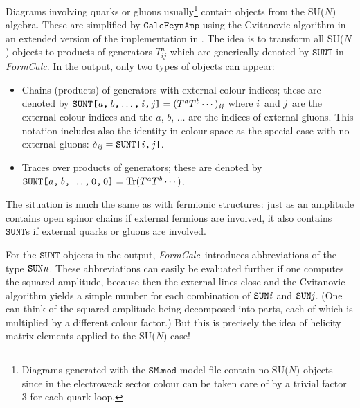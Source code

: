 \documentclass[twoside,11pt]{article}
\makeatletter
\def\indextt#1{\index{#1@\texttt{#1}}}
\def\FC{\textit{FormCalc}}
\def\Var#1{\ensuremath{\mathit{#1}}}
\def\Va{\Var{a}}
\def\Vb{\Var{b}}
\def\Vi{\Var{i}}
\def\Vj{\Var{j}}
\def\Vn{\Var{n}}
\def\Code#1{\ensuremath{\texttt{#1}}}
\def\limfunc#1{\mathop{\mathrm{#1}}}
\def\Tr{\limfunc{Tr}}
\makeatother
\begin{document}
Diagrams involving quarks or gluons usually\footnote{%
	Diagrams generated with the \Code{SM.mod} model file contain no
	SU($N$) objects since in the electroweak sector colour can be
	taken care of by a trivial factor 3 for each quark loop.}
contain objects from the SU($N$) algebra.  These are simplified by
\Code{CalcFeynAmp} using the Cvitanovic algorithm \cite{Cv76} in an
extended version of the implementation in \cite{Ve96}.  The idea is to
transform all SU($N$) objects to products of generators $T^a_{ij}$ which
are generically denoted by \Code{SUNT} in \FC.  In the output, only two
types of objects can appear:
\begin{itemize}
\item
Chains (products) of generators with external colour indices; these are
denoted by $\Code{SUNT[\Va,\,\Vb,\,$\dots$,\,\Vi,\,\Vj]} =
(T^\Va T^\Vb\cdots)_{\Vi\Vj}$ where \Vi\ and \Vj\ are the
external colour indices and the \Va, \Vb, $\dots$ are the indices
of external gluons.  This notation includes also the identity in colour
space as the special case with no external gluons: $\delta_{\Vi\Vj} = 
\Code{SUNT[\Vi,\,\Vj]}$.

\item
Traces over products of generators; these are denoted by
$\Code{SUNT[\Va,\,\Vb,\,$\dots$,\,0,\,0]} = \Tr(T^\Va T^\Vb\cdots)$.
\end{itemize}
The situation is much the same as with fermionic structures: just as
an amplitude contains open spinor chains if external fermions are
involved, it also contains \Code{SUNT}s if external quarks or gluons are
involved.
\indextt{SUNT}%
%
%
%
%

For the \Code{SUNT} objects in the output, \FC\ introduces abbreviations
of the type \Code{SUN\Vn}.  These abbreviations can easily be
evaluated further if one computes the squared amplitude, because then
the external lines close and the Cvitanovic algorithm yields a simple
number for each combination of \Code{SUN\Vi} and \Code{SUN\Vj}. 
(One can think of the squared amplitude being decomposed into parts,
each of which is multiplied by a different colour factor.)  But this is
precisely the idea of helicity matrix elements applied to the SU($N$)
case!
\end{document}
